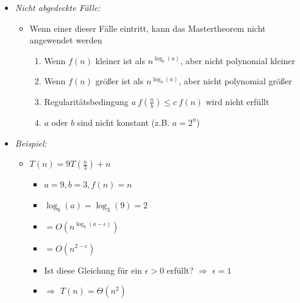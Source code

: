 \documentclass[
    12pt,
    a4paper,
    ngerman,
    color=3b,%
    marginpar=false,
    colorback=false,
    leqno,
]{tudaexercise}
\begin{document}
\begin{itemize}
\begin{itemize}
              \item \textit{Nicht abgedeckte Fälle:}
                    \begin{itemize}
                        \item Wenn einer dieser Fälle eintritt, kann das Mastertheorem nicht angewendet werden
                              \begin{enumerate}
                                  \item Wenn $f(n)$ kleiner ist als $n^{\log_b(a)}$, aber nicht polynomial kleiner
                                  \item Wenn $f(n)$ größer ist als $n^{\log_b(a)}$, aber nicht polynomial größer
                                  \item Regularitätsbedingung $a~f(\frac{n}{b}) \leq c~f(n)$ wird nicht erfüllt
                                  \item $a$ oder $b$ sind nicht konstant (z.B. $a=2^n$)
                              \end{enumerate}
                    \end{itemize}
                    \clearpage
              \item \textit{Beispiel:}
                    \begin{itemize}
                        \item \textit{$T(n) = 9T(\frac{n}{3}) + n$}
                              \begin{itemize}
                                  \item $a=9, b=3, f(n)=n$
                                  \item $\log_b(a) = \log_3(9) = 2$
                                  \item {} $= O(n^{\log_b(a-\epsilon)})$
                                  \item[] {\makebox[1.5cm][l]{}} $= O(n^{2-\epsilon})$
                                  \item Ist diese Gleichung für ein $\epsilon > 0$ erfüllt? $\Rightarrow$ $\epsilon = 1$
                                  \item {} $\Rightarrow$ $T(n) = \Theta(n^2)$
                              \end{itemize}


\end{itemize}
\end{itemize}
\end{itemize}
\end{document}
